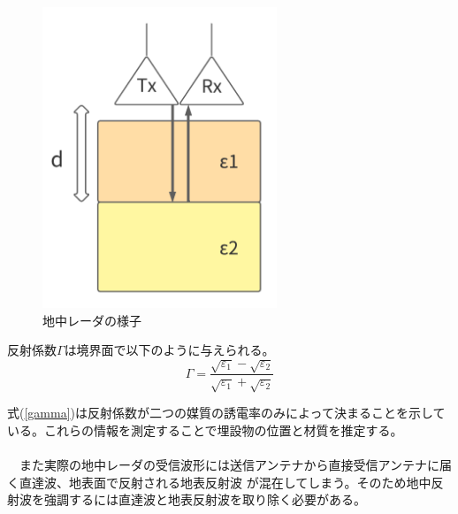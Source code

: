 \documentclass[12pt,a4paper]{jsreport}
\begin{document}
    \begin{figure}[h]
        \begin{center}
            \includegraphics[width=7cm]{./image/antenna_depth_2.pdf}

            \caption{地中レーダの様子}\label{地中レーダの様子}
        \end{center}
    \end{figure}

反射係数$\Gamma$は境界面で以下のように与えられる。
\begin{equation}
  \Gamma=
  \frac{\sqrt{\varepsilon_{1}}-\sqrt{\varepsilon_{2}}}{\sqrt{\varepsilon_{1}}+\sqrt{\varepsilon_{2}}} 
\label{gamma}  
\end{equation}


式(\ref{gamma})は反射係数が二つの媒質の誘電率のみによって決まることを示している。これらの情報を測定することで埋設物の位置と材質を推定する。
\\
\\　また実際の地中レーダの受信波形には送信アンテナから直接受信アンテナに届く直達波、地表面で反射される地表反射波
が混在してしまう。そのため地中反射波を強調するには直達波と地表反射波を取り除く必要がある。
\end{document}

